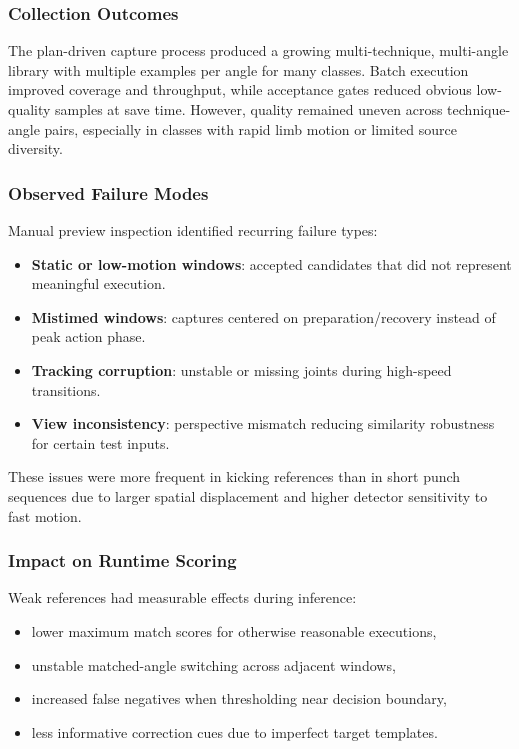 \documentclass[12pt]{article}
\begin{document}
{\subsubsection{Collection Outcomes}

The plan-driven capture process produced a growing multi-technique, multi-angle library with multiple examples per angle for many classes. Batch execution improved coverage and throughput, while acceptance gates reduced obvious low-quality samples at save time. However, quality remained uneven across technique-angle pairs, especially in classes with rapid limb motion or limited source diversity.

\subsubsection{Observed Failure Modes}

Manual preview inspection identified recurring failure types:

\begin{itemize}
    \item \textbf{Static or low-motion windows}: accepted candidates that did not represent meaningful execution.
    \item \textbf{Mistimed windows}: captures centered on preparation/recovery instead of peak action phase.
    \item \textbf{Tracking corruption}: unstable or missing joints during high-speed transitions.
    \item \textbf{View inconsistency}: perspective mismatch reducing similarity robustness for certain test inputs.
\end{itemize}

These issues were more frequent in kicking references than in short punch sequences due to larger spatial displacement and higher detector sensitivity to fast motion.

\subsubsection{Impact on Runtime Scoring}

Weak references had measurable effects during inference:

\begin{itemize}
    \item lower maximum match scores for otherwise reasonable executions,
    \item unstable matched-angle switching across adjacent windows,
    \item increased false negatives when thresholding near decision boundary,
    \item less informative correction cues due to imperfect target templates.
\end{itemize}

}
\end{document}
